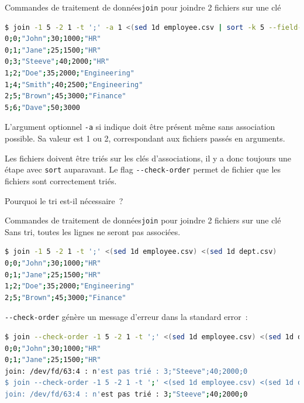 \documentclass{beamer}
\begin{document}
    \begin{frame}[fragile]{Commandes de traitement de données}{\lstinline{join} pour joindre 2 fichiers sur une clé}
        \begin{lstlisting}[language=bash,basicstyle=\tiny\ttfamily]
$ join -1 5 -2 1 -t ';' -a 1 <(sed 1d employee.csv | sort -k 5 --field-separator=';') <(sed 1d dept.csv | sort -k 1 --field-separator=';')
0;0;"John";30;1000;"HR"
0;1;"Jane";25;1500;"HR"
0;3;"Steeve";40;2000;"HR"
1;2;"Doe";35;2000;"Engineering"
1;4;"Smith";40;2500;"Engineering"
2;5;"Brown";45;3000;"Finance"
5;6;"Dave";50;3000
        \end{lstlisting}
        L'argument optionnel \lstinline{-a} si indique doit être présent même sans association possible.
        Sa valeur est 1 ou 2, correspondant aux fichiers passés en arguments.
        \begin{dangercolorbox}
            Les fichiers doivent être triés sur les clés d'associations, il y a donc toujours une étape avec \lstinline{sort} auparavant.
            \bigbreak
            Le flag \lstinline{--check-order} permet de fichier que les fichiers sont correctement triés.
        \end{dangercolorbox}
        \bigbreak
        Pourquoi le tri est-il nécessaire~?
    \end{frame}

    \begin{frame}[fragile]{Commandes de traitement de données}{\lstinline{join} pour joindre 2 fichiers sur une clé}
        Sans tri, toutes les lignes ne seront pas associées.
        \begin{lstlisting}[language=bash,basicstyle=\tiny\ttfamily]
$ join -1 5 -2 1 -t ';' <(sed 1d employee.csv) <(sed 1d dept.csv)
0;0;"John";30;1000;"HR"
0;1;"Jane";25;1500;"HR"
1;2;"Doe";35;2000;"Engineering"
2;5;"Brown";45;3000;"Finance"
        \end{lstlisting}
        \lstinline{--check-order} génère un message d'erreur dans la standard error~:
        \begin{lstlisting}[language=bash,basicstyle=\tiny\ttfamily]
$ join --check-order -1 5 -2 1 -t ';' <(sed 1d employee.csv) <(sed 1d dept.csv)
0;0;"John";30;1000;"HR"
0;1;"Jane";25;1500;"HR"
join: /dev/fd/63:4 : n'est pas trié : 3;"Steeve";40;2000;0
$ join --check-order -1 5 -2 1 -t ';' <(sed 1d employee.csv) <(sed 1d dept.csv) 1> /dev/null
join: /dev/fd/63:4 : n'est pas trié : 3;"Steeve";40;2000;0
        \end{lstlisting}
    \end{frame}
\end{document}

